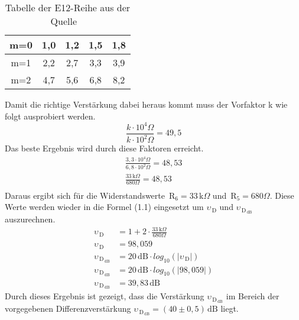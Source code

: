  \begin{table}[h!]
            \centering
            \caption{Tabelle der E12-Reihe aus der Quelle ~\cite{wiki}}
            \begin{tabular}{| c | c | c | c | c |} 
                \hline
              m=0  & 1,0 & 1,2  & 1,5 & 1,8  \\
                \hline
              m=1 & 2,2 & 2,7 & 3,3 & 3,9 \\ 
                \hline
              m=2 & 4,7 & 5,6 & 6,8 & 8,2 \\
                \hline
            \end{tabular}
            \label{tab:E12}
        \end{table}
\newpage
Damit die richtige Verstärkung dabei heraus kommt muss der Vorfaktor k wie folgt ausprobiert werden.
\begin{equation*}
\frac{k\cdot 10^4\Omega}{k\cdot 10^2\Omega}=49,5
\end{equation*}
Das beste Ergebnis wird durch diese Faktoren erreicht.
\begin{align*}
\frac{3,3\cdot 10^4\Omega}{6,8\cdot 10^2\Omega}=48,53\\
\frac{33\,\text{k}\Omega}{680\Omega}=48,53\\
\end{align*}
Daraus ergibt sich für die Widerstandswerte $\,\text{R}_6=33\,\text{k}\Omega$ und $\,\text{R}_5=680\Omega$.
Diese Werte werden wieder in die Formel (1.1) eingesetzt um $\upsilon_{\,\text{D}}$ und $\upsilon_{\,\text{D}_{\,\text{dB}}}$ auszurechnen.
\begin{align*}
\upsilon_{\,\text{D}} & = 1+2\cdot \frac{33\,\text{k}\Omega}{680\Omega}\\
\upsilon_{\,\text{D}} & = 98,059\\
\upsilon_{\,\text{D}_{\,\text{dB}}} & = 20\,\text{dB}\cdot log_{10}(|\upsilon_{\,\text{D}}|)\\
\upsilon_{\,\text{D}_{\,\text{dB}}} & = 20\,\text{dB}\cdot log_{10}(|98,059|)\\
\upsilon_{\,\text{D}_{\,\text{dB}}} & = 39,83\,\text{dB}
\end{align*}
Durch dieses Ergebnis ist gezeigt, dass die Verstärkung $\upsilon_{\,\text{D}_{\,\text{dB}}}$ im Bereich der vorgegebenen Differenzverstärkung $\upsilon_{\,\text{D}_{\,\text{dB}}}=(40\pm 0,5)\,\text{dB}$ liegt.\\
\newpage
